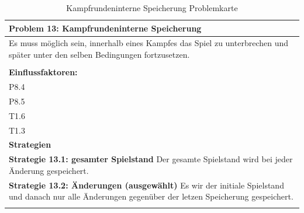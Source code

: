 \documentclass[fontsize=12pt,paper=a4,twoside]{scrartcl}
\begin{document}
\begin{table}[H]
    \centering
    \begin{tabular}{|p{15cm}|}
    \hline
          \textbf{Problem 13: Kampfrundeninterne Speicherung}  \\ \hline
	Es muss möglich sein, innerhalb eines Kampfes das Spiel zu unterbrechen und später unter den selben Bedingungen fortzusetzen. \\
         \\ \hline
          \textbf{Einflussfaktoren: } \\
	P8.4 \\
	P8.5 \\
	T1.6 \\
	T1.3 \\
          \hline
          \textbf{Strategien} \\ \hline
            {}          
           \label{strategie:13.1}     
          \textbf{Strategie 13.1: gesamter Spielstand} Der gesamte Spielstand wird bei jeder Änderung gespeichert.  \\        
  {}          
           \label{strategie:13.2}              
          \textbf{Strategie 13.2: Änderungen (ausgewählt)} Es wir der initiale Spielstand und danach nur alle Änderungen gegenüber der letzen Speicherung gespeichert.  \\
	 \\ \hline
    \end{tabular}

    \caption{Kampfrundeninterne Speicherung Problemkarte}
    \label{tab:ProblemKarte13}
\end{table}
\end{document}
